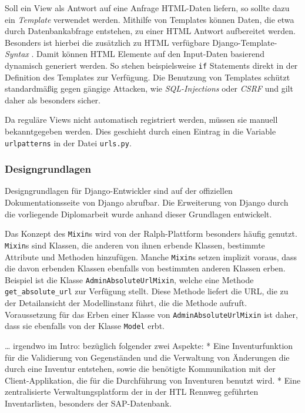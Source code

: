 Soll ein View als Antwort auf eine Anfrage HTML-Daten liefern, so sollte
dazu ein \emph{Template}
verwendet werden. Mithilfe von Templates können Daten, die etwa durch
Datenbankabfrage entstehen, zu einer HTML Antwort aufbereitet werden.
Besonders ist hierbei die zusätzlich zu HTML verfügbare
Django-Template-\emph{Syntax}
\cite{django-doku-template}. Damit können HTML Elemente auf den
Input-Daten basierend dynamisch generiert werden. So stehen
beispielsweise \texttt{if} Statements direkt in der Definition des
Templates zur Verfügung. Die Benutzung von Templates schützt
standardmäßig gegen gängige Attacken, wie
\emph{SQL-Injections}
oder \emph{CSRF}
\cite{csrf}
und gilt daher als besonders sicher.

Da reguläre Views nicht automatisch registriert werden, müssen sie
manuell bekanntgegeben werden. Dies geschieht durch einen Eintrag in die
Variable \texttt{urlpatterns} in der Datei \texttt{urls.py}.
\cite{django-doku-urls}

\hypertarget{designgrundlagen}{%
\subsubsection{Designgrundlagen}\label{designgrundlagen}}

Designgrundlagen für Django-Entwickler sind auf der offiziellen
Dokumentationsseite von Django abrufbar. \cite{django-doku-coding-style}
Die Erweiterung von Django durch die vorliegende Diplomarbeit wurde
anhand dieser Grundlagen entwickelt.

Das Konzept des \texttt{Mixin}s wird von der Ralph-Plattform besonders
häufig genutzt. \texttt{Mixin}s sind Klassen, die anderen von ihnen
erbende Klassen, bestimmte Attribute und Methoden hinzufügen. Manche
\texttt{Mixin}s setzen implizit voraus, dass die davon erbenden Klassen
ebenfalls von bestimmten anderen Klassen erben. Beispiel ist die Klasse
\texttt{AdminAbsoluteUrlMixin}, welche eine Methode
\texttt{get\_absolute\_url} zur Verfügung stellt. Diese Methode liefert
die URL, die zu der Detailansicht der Modellinstanz führt, die die
Methode aufruft. Voraussetzung für das Erben einer Klasse von
\texttt{AdminAbsoluteUrlMixin} ist daher, dass sie ebenfalls von der
Klasse \texttt{Model} erbt.


\ldots{} irgendwo im Intro: bezüglich folgender zwei Aspekte: * Eine
Inventurfunktion für die Validierung von Gegenständen und die Verwaltung
von Änderungen die durch eine Inventur entstehen, sowie die benötigte
Kommunikation mit der Client-Applikation, die für die Durchführung von
Inventuren benutzt wird. * Eine zentralisierte Verwaltungsplatform der
in der HTL Rennweg geführten Inventarlisten, besonders der
SAP-Datenbank.

